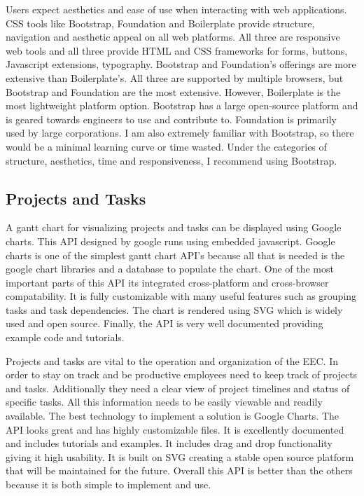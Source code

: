 \documentclass[letterpaper,10pt,titlepage,journal,compsoc,draftclsnofoot,onecolumn]{IEEEtran}
\newcommand\tab[1][1cm]{\hspace*{#1}}
\begin{document}
Users expect aesthetics and ease of use when interacting with web applications. CSS tools like Bootstrap, Foundation and Boilerplate provide structure, navigation and aesthetic appeal on all web platforms. All three are responsive web tools and all three provide HTML and CSS frameworks for forms, buttons, Javascript extensions, typography. Bootstrap and Foundation’s offerings are more extensive than Boilerplate’s. All three are supported by multiple browsers, but Bootstrap and Foundation are the most extensive. However, Boilerplate is the most lightweight platform option. Bootstrap has a large open-source platform and is geared towards engineers to use and contribute to. Foundation is primarily used by large corporations. I am also extremely familiar with Bootstrap, so there would be a minimal learning curve or time wasted. Under the categories of structure, aesthetics, time and responsiveness, I recommend using Bootstrap. 

\subsection{Projects and Tasks}

\tab A gantt chart for visualizing projects and tasks can be displayed using Google charts. This API designed by google runs using embedded javascript. Google charts is one of the simplest gantt chart API’s because all that is needed is the google chart libraries and a database to populate the chart. One of the most important parts of this API its integrated cross-platform and cross-browser compatability. It is fully customizable with many useful features such as grouping tasks and task dependencies. The chart is rendered using SVG which is widely used and open source. Finally, the API is very well documented providing example code and tutorials.\newline

\tab Projects and tasks are vital to the operation and organization of the EEC. In order to stay on track and be productive employees need to keep track of projects and tasks. Additionally they need a clear view of project timelines and status of specific tasks. All this information needs to be easily viewable and readily available. The best technology to implement a solution is Google Charts. The API looks great and has highly customizable files. It is excellently documented and includes tutorials and examples. It includes drag and drop functionality giving it high usability. It is built on SVG creating a stable open source platform that will be maintained for the future. Overall this API is better than the others because it is both simple to implement and use.
\end{document}
